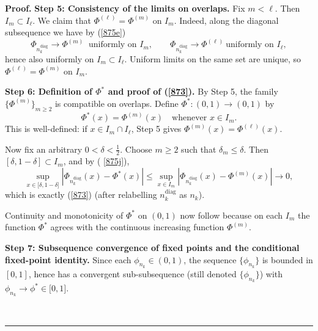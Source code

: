 \documentclass[onecolumn]{article}
\newenvironment{proof}[1][Proof]{\noindent\textbf{#1.} }{\ \rule{0.5em}{0.5em}}
\begin{document}
\begin{proof}
\smallskip \noindent \textbf{Step 5: Consistency of the limits on overlaps.}
Fix $m<\ell $. Then $I_{m}\subset I_{\ell }$. We claim that $\Phi ^{(\ell
)}=\Phi ^{(m)}$ on $I_{m}$. Indeed, along the diagonal subsequence we have
by (\ref{875e}) 
\begin{equation}
\Phi _{n_{k}^{\mathrm{diag}}}\rightarrow \Phi ^{(m)}\ \text{ uniformly on }%
I_{m},\qquad \Phi _{n_{k}^{\mathrm{diag}}}\rightarrow \Phi ^{(\ell )}\ \text{
uniformly on }I_{\ell },  \label{875k}
\end{equation}%
hence also uniformly on $I_{m}\subset I_{\ell }$. Uniform limits on the same
set are unique, so $\Phi ^{(\ell )}=\Phi ^{(m)}$ on $I_{m}$.

\textbf{Step 6: Definition of $\Phi ^{\ast }$ and proof of (\ref{873}).} By
Step 5, the family $\{\Phi ^{(m)}\}_{m\geq 2}$ is compatible on overlaps.
Define $\Phi ^{\ast }:(0,1)\rightarrow (0,1)$ by 
\begin{equation}
\Phi ^{\ast }(x)=\Phi ^{(m)}(x)\quad \text{whenever }x\in I_{m}.
\label{875l}
\end{equation}%
This is well-defined: if $x\in I_{m}\cap I_{\ell }$, Step 5 gives $\Phi
^{(m)}(x)=\Phi ^{(\ell )}(x)$.

Now fix an arbitrary $0<\delta <\tfrac{1}{2}$. Choose $m\geq 2$ such that $%
\delta _{m}\leq \delta $. Then $[\delta ,1-\delta ]\subset I_{m}$, and by (%
\ref{875j}), 
\begin{equation}
\sup_{x\in \lbrack \delta ,1-\delta ]}\left\vert \Phi _{n_{k}^{\mathrm{diag}%
}}(x)-\Phi ^{\ast }(x)\right\vert \leq \sup_{x\in I_{m}}\left\vert \Phi
_{n_{k}^{\mathrm{diag}}}(x)-\Phi ^{(m)}(x)\right\vert \rightarrow 0,
\label{875z}
\end{equation}%
which is exactly (\ref{873}) (after relabelling $n_{k}^{\mathrm{diag}}$ as $%
n_{k}$).

Continuity and monotonicity of $\Phi ^{\ast }$ on $(0,1)$ now follow because
on each $I_{m}$ the function $\Phi ^{\ast }$ agrees with the continuous
increasing function $\Phi ^{(m)}$.

\smallskip \noindent \textbf{Step 7: Subsequence convergence of fixed points
and the conditional fixed-point identity.} Since each $\phi _{n_{k}}\in
(0,1) $, the sequence $\{\phi _{n_{k}}\}$ is bounded in $[0,1]$, hence has a
convergent sub-subsequence (still denoted $\{\phi _{n_{k}}\}$) with $\phi
_{n_{k}}\rightarrow \phi ^{\ast }\in \lbrack 0,1]$.


\end{proof}
\end{document}
